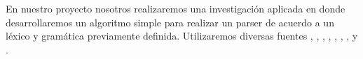 En nuestro proyecto nosotros realizaremos una investigación aplicada en donde desarrollaremos un algoritmo simple para realizar un parser  de acuerdo a un léxico y gramática previamente definida. Utilizaremos diversas fuentes \cite{box_2018}, \cite{L5CFG_2017}, \cite{NLPOverview}, \cite{CFGandParsing_2015}, \cite{CFGWiki}, \cite{CYKAlgorithmWiki}, \cite{EPWiki}, \cite{LRParser} y \cite{LLParser}. 